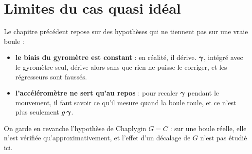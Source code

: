
\section{Limites du cas quasi idéal}

Le chapitre précédent repose sur des hypothèses qui ne tiennent pas sur
une vraie boule :
\begin{itemize}
    \item \textbf{le biais du gyromètre est constant} : en réalité, il
    dérive. $\bm{\gamma}$, intégré avec le gyromètre seul, dérive alors
    sans que rien ne puisse le corriger, et les régresseurs sont faussés.
    \item \textbf{l'accéléromètre ne sert qu'au repos} : pour recaler
    $\bm{\gamma}$ pendant le mouvement, il faut savoir ce qu'il mesure
    quand la boule roule, et ce n'est plus seulement $g\,\bm{\gamma}$.
\end{itemize}
On garde en revanche l'hypothèse de Chaplygin $G = C$ : sur une boule réelle, elle n'est vérifiée qu'approximativement, et l'effet d'un décalage de $G$ n'est pas étudié ici.
